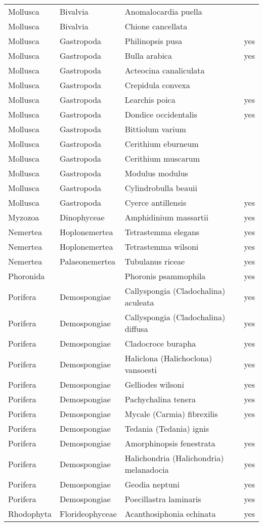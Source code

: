 \begin{longtable}{lllll}
  Mollusca & Bivalvia & Anomalocardia puella &  &  \\ 
  Mollusca & Bivalvia & Chione cancellata &  &  \\ 
  Mollusca & Gastropoda & Philinopsis pusa &  & yes \\ 
  Mollusca & Gastropoda & Bulla arabica &  & yes \\ 
  Mollusca & Gastropoda & Acteocina canaliculata &  &  \\ 
  Mollusca & Gastropoda & Crepidula convexa &  &  \\ 
  Mollusca & Gastropoda & Learchis poica &  & yes \\ 
  Mollusca & Gastropoda & Dondice occidentalis &  & yes \\ 
  Mollusca & Gastropoda & Bittiolum varium &  &  \\ 
  Mollusca & Gastropoda & Cerithium eburneum &  &  \\ 
  Mollusca & Gastropoda & Cerithium muscarum &  &  \\ 
  Mollusca & Gastropoda & Modulus modulus &  &  \\ 
  Mollusca & Gastropoda & Cylindrobulla beauii &  &  \\ 
  Mollusca & Gastropoda & Cyerce antillensis &  & yes \\ 
  Myzozoa & Dinophyceae & Amphidinium massartii &  & yes \\ 
  Nemertea & Hoplonemertea & Tetrastemma elegans &  & yes \\ 
  Nemertea & Hoplonemertea & Tetrastemma wilsoni &  & yes \\ 
  Nemertea & Palaeonemertea & Tubulanus riceae &  & yes \\ 
  Phoronida &  & Phoronis psammophila &  & yes \\ 
  Porifera & Demospongiae & Callyspongia (Cladochalina) aculeata &  & yes \\ 
  Porifera & Demospongiae & Callyspongia (Cladochalina) diffusa &  & yes \\ 
  Porifera & Demospongiae & Cladocroce burapha &  & yes \\ 
  Porifera & Demospongiae & Haliclona (Halichoclona) vansoesti &  & yes \\ 
  Porifera & Demospongiae & Gelliodes wilsoni &  & yes \\ 
  Porifera & Demospongiae & Pachychalina tenera &  & yes \\ 
  Porifera & Demospongiae & Mycale (Carmia) fibrexilis &  & yes \\ 
  Porifera & Demospongiae & Tedania (Tedania) ignis &  &  \\ 
  Porifera & Demospongiae & Amorphinopsis fenestrata &  & yes \\ 
  Porifera & Demospongiae & Halichondria (Halichondria) melanadocia &  & yes \\ 
  Porifera & Demospongiae & Geodia neptuni &  & yes \\ 
  Porifera & Demospongiae & Poecillastra laminaris &  & yes \\ 
  Rhodophyta & Florideophyceae & Acanthosiphonia echinata &  & yes \\ 
   \hline
\hline
\end{longtable}
\endgroup
